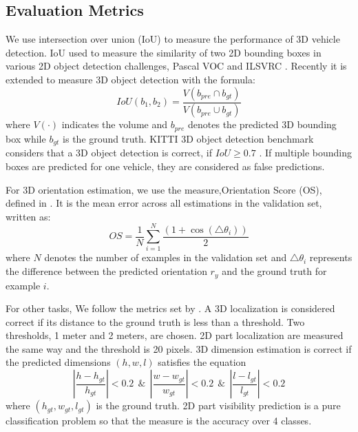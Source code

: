 \subsection{Evaluation Metrics}
\label{eval_met}

We use intersection over union (IoU) to measure the performance of 3D vehicle detection. IoU used to measure the similarity of two 2D bounding boxes in various 2D object detection challenges, \eg Pascal VOC \cite{Everingham15} and ILSVRC \cite{DBLP:Russakovsky14}. Recently it is extended to measure 3D object detection with the formula:
\begin{equation}
	IoU(b_1, b_2) = \frac{V(b_{pre}\cap b_{gt})}{V(b_{pre}\cup b_{gt})}
\end{equation}
where $V(\cdot)$ indicates the volume and $b_{pre}$ denotes the predicted 3D bounding box while $b_{gt}$ is the ground truth. KITTI 3D object detection benchmark considers that a 3D object detection is correct, if $IoU \geq 0.7$ \cite{Geiger2012CVPR}. If multiple bounding boxes are predicted for one vehicle, they are considered as false predictions. %

For 3D orientation estimation, we use the measure,Orientation Score (OS), defined in \cite{DBLP:journals/corr/MousavianAFK16}. It is the mean error across all estimations in the validation set, written as:
\begin{equation}
	OS =\frac{1}{N} \sum_{i=1}^N\frac{(1+\cos(\triangle \theta_i))}{2}
\end{equation}
where $N$ denotes the number of examples in the validation set and $\triangle \theta_i$ represents the difference between the predicted orientation $r_y$ and the ground truth for example $i$.

 For other tasks, We follow the metrics set by \cite{DBLP:journals/corr/ChabotCRTC17}. A 3D localization is considered correct if its distance to the ground truth is less than a threshold. Two thresholds, 1 meter and 2 meters, are chosen. 2D part localization are measured the same way and the threshold is 20 pixels. 3D dimension estimation is correct if the predicted dimensions $(h, w, l)$ satisfies the equation
\begin{equation}
	\left | \frac{h-h_{gt}}{h_{gt}} \right | < 0.2  ~~\&~~\left | \frac{w-w_{gt}}{w_{gt}} \right | < 0.2  ~~\&~~ \left | \frac{l-l_{gt}}{l_{gt}} \right | < 0.2
\end{equation}
where $(h_{gt}, w_{gt}, l_{gt})$ is the ground truth. 2D part visibility prediction is a pure classification problem so that the measure is the accuracy over 4 classes.

